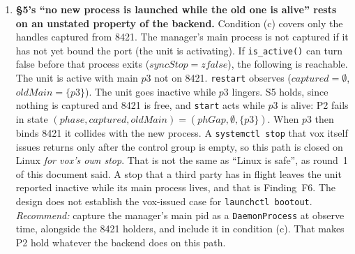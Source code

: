 \documentclass[a4paper,10pt,fleqn]{article}
\begin{document}
\begin{enumerate}
  \item[\textbf{F5.}] \textbf{\S5's ``no new process is launched while the
    old one is alive'' rests on an unstated property of the backend.}
    Condition (c) covers only the handles captured from 8421. The manager's
    main process is not captured if it has not yet bound the port (the unit
    is activating). If \texttt{is\_active()} can turn false before that
    process exits ($syncStop = zfalse$), the following is reachable. The unit
    is active with main $p3$ not on 8421. \texttt{restart} observes
    ($captured = \emptyset$, $oldMain = \{p3\}$). The unit goes inactive while
    $p3$ lingers. S5 holds, since nothing is captured and 8421 is free, and
    \texttt{start} acts while $p3$ is alive: P2 fails in state
    $(phase, captured, oldMain) = (phGap, \emptyset, \{p3\})$. When $p3$
    then binds 8421 it collides with the new process. A \texttt{systemctl
    stop} that vox itself issues returns only after the control group is
    empty, so this path is closed on Linux \emph{for vox's own stop}. That
    is not the same as ``Linux is safe'', as round~1 of this document said.
    A stop that a third party has in flight leaves the unit reported
    inactive while its main process lives, and that is Finding~F6. The
    design does not establish the vox-issued case for \texttt{launchctl
    bootout}. \emph{Recommend:} capture the manager's main pid as a
    \texttt{DaemonProcess} at observe time, alongside the 8421 holders, and
    include it in condition (c). That makes P2 hold whatever the backend
    does on this path.


\end{enumerate}
\end{document}
